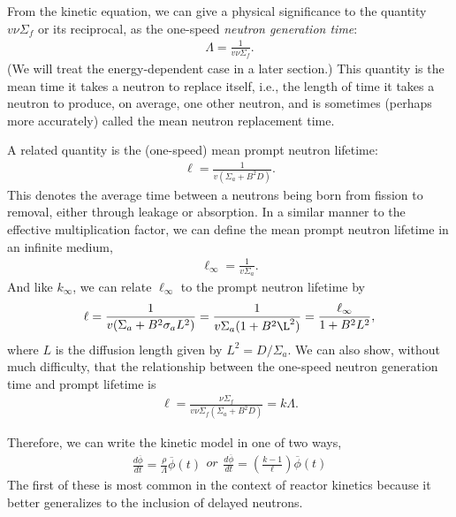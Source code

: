 From the kinetic equation, we can give a physical significance to the quantity $v \nu \Sigma_f$ or its reciprocal, as the one-speed \emph{neutron generation time}:
\begin{align}
  \Lambda = \frac{1}{v \nu \Sigma_f} . \label{Eq:kinetics_neutronGenerationTime_oneSpeed}
\end{align}
(We will treat the energy-dependent case in a later section.) This quantity is the mean time it takes a neutron to replace itself, i.e., the length of time it takes a neutron to produce, on average, one other neutron, and is sometimes (perhaps more accurately) called the mean neutron replacement time.

A related quantity is the (one-speed) mean prompt neutron lifetime:
\begin{align}
  \ell = \frac{1}{ v ( \Sigma_a + B^2 D ) } .
\end{align}
This denotes the average time between a neutrons being born from fission to removal, either through leakage or absorption. In a similar manner to the effective multiplication factor, we can define the mean prompt neutron lifetime in an infinite medium,
\begin{align}
  \ell_\infty = \frac{1}{v \Sigma_a }.
\end{align}
And like $k_\infty$, we can relate $\ell_\infty$ to the prompt neutron lifetime by
\begin{align}
  \ell = \frac{1}{ v ( \Sigma_a + B^2 \sigma_a L^2 ) } =  \frac{1}{ v \Sigma_a ( 1 + B^2 \L^2 ) }  = \frac{ \ell_\infty }{ 1 + B^2 L^2 } ,
\end{align}
where $L$ is the diffusion length given by $L^2 = D / \Sigma_a$. We can also show, without much difficulty, that the relationship between the one-speed neutron generation time and prompt lifetime is
\begin{align}
  \ell = \frac{\nu \Sigma_f}{ v \nu \Sigma_f ( \Sigma_a + B^2 D ) } = k \Lambda .
\end{align}

Therefore, we can write the kinetic model in one of two ways,
\begin{subequations}
\begin{align}
  \frac{d \overline{\phi}}{dt} = \frac{\rho}{\Lambda} \overline{\phi}(t) 
\end{align}
or
\begin{align}
  \frac{d \overline{\phi}}{dt} = \left( \frac{ k - 1 }{ \ell } \right) \overline{\phi}(t)
\end{align}
\end{subequations}
The first of these is most common in the context of reactor kinetics because it better generalizes to the inclusion of delayed neutrons. 


